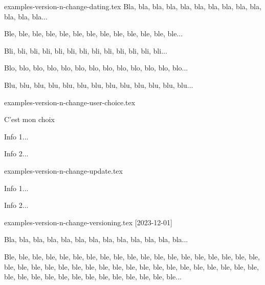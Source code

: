 

\begin{filecontents*}[overwrite]{examples-version-n-change-dating.tex}
Bla, bla, bla, bla, bla, bla, bla, bla, bla, bla, bla, bla, bla...

\medskip %


Ble, ble, ble, ble, ble, ble, ble, ble, ble, ble, ble, ble, ble...

\medskip %


Bli, bli, bli, bli, bli, bli, bli, bli, bli, bli, bli, bli, bli...

Blo, blo, blo, blo, blo, blo, blo, blo, blo, blo, blo, blo, blo...

Blu, blu, blu, blu, blu, blu, blu, blu, blu, blu, blu, blu, blu...
\end{filecontents*}


\begin{filecontents*}[overwrite]{examples-version-n-change-user-choice.tex}
\begin{tdoctopic}{C'est mon choix}
    \item Info 1...
    \item Info 2...
\end{tdoctopic}
\end{filecontents*}


\begin{filecontents*}[overwrite]{examples-version-n-change-update.tex}
\begin{tdocupdate}
    \item Info 1...
    \item Info 2...
\end{tdocupdate}
\end{filecontents*}


\begin{filecontents*}[overwrite]{examples-version-n-change-versioning.tex}
[2023-12-01]

Bla, bla, bla, bla, bla, bla, bla, bla, bla, bla, bla, bla, bla...

\bigskip %


Ble, ble, ble, ble, ble, ble, ble, ble, ble, ble, ble, ble, ble,
ble, ble, ble, ble, ble, ble, ble, ble, ble, ble, ble, ble, ble,
ble, ble, ble, ble, ble, ble, ble, ble, ble, ble, ble, ble, ble,
ble, ble, ble, ble, ble, ble, ble, ble, ble, ble, ble, ble...
\end{filecontents*}



